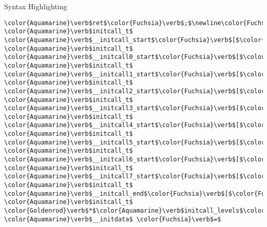 \begin{frame}{Syntax Highlighting}
\begin{verbatim}
\color{Aquamarine}\verb$ret$\color{Fuchsia}\verb$;$\newline\color{Fuchsia}\verb$}$\newline\newline\newline\color{BurntOrange}\verb$extern$ \color{Aquamarine}\verb$initcall_t$ \color{Aquamarine}\verb$__initcall_start$\color{Fuchsia}\verb$[$\color{Fuchsia}\verb$]$\color{Fuchsia}\verb$;$\newline\color{BurntOrange}\verb$extern$ \color{Aquamarine}\verb$initcall_t$ \color{Aquamarine}\verb$__initcall0_start$\color{Fuchsia}\verb$[$\color{Fuchsia}\verb$]$\color{Fuchsia}\verb$;$\newline\color{BurntOrange}\verb$extern$ \color{Aquamarine}\verb$initcall_t$ \color{Aquamarine}\verb$__initcall1_start$\color{Fuchsia}\verb$[$\color{Fuchsia}\verb$]$\color{Fuchsia}\verb$;$\newline\color{BurntOrange}\verb$extern$ \color{Aquamarine}\verb$initcall_t$ \color{Aquamarine}\verb$__initcall2_start$\color{Fuchsia}\verb$[$\color{Fuchsia}\verb$]$\color{Fuchsia}\verb$;$\newline\color{BurntOrange}\verb$extern$ \color{Aquamarine}\verb$initcall_t$ \color{Aquamarine}\verb$__initcall3_start$\color{Fuchsia}\verb$[$\color{Fuchsia}\verb$]$\color{Fuchsia}\verb$;$\newline\color{BurntOrange}\verb$extern$ \color{Aquamarine}\verb$initcall_t$ \color{Aquamarine}\verb$__initcall4_start$\color{Fuchsia}\verb$[$\color{Fuchsia}\verb$]$\color{Fuchsia}\verb$;$\newline\color{BurntOrange}\verb$extern$ \color{Aquamarine}\verb$initcall_t$ \color{Aquamarine}\verb$__initcall5_start$\color{Fuchsia}\verb$[$\color{Fuchsia}\verb$]$\color{Fuchsia}\verb$;$\newline\color{BurntOrange}\verb$extern$ \color{Aquamarine}\verb$initcall_t$ \color{Aquamarine}\verb$__initcall6_start$\color{Fuchsia}\verb$[$\color{Fuchsia}\verb$]$\color{Fuchsia}\verb$;$\newline\color{BurntOrange}\verb$extern$ \color{Aquamarine}\verb$initcall_t$ \color{Aquamarine}\verb$__initcall7_start$\color{Fuchsia}\verb$[$\color{Fuchsia}\verb$]$\color{Fuchsia}\verb$;$\newline\color{BurntOrange}\verb$extern$ \color{Aquamarine}\verb$initcall_t$ \color{Aquamarine}\verb$__initcall_end$\color{Fuchsia}\verb$[$\color{Fuchsia}\verb$]$\color{Fuchsia}\verb$;$\newline\newline\color{BurntOrange}\verb$static$ \color{Aquamarine}\verb$initcall_t$ \color{Goldenrod}\verb$*$\color{Aquamarine}\verb$initcall_levels$\color{Fuchsia}\verb$[$\color{Fuchsia}\verb$]$ \color{Aquamarine}\verb$__initdata$ \color{Fuchsia}\verb$=$ 
\end{verbatim}
\end{frame}

